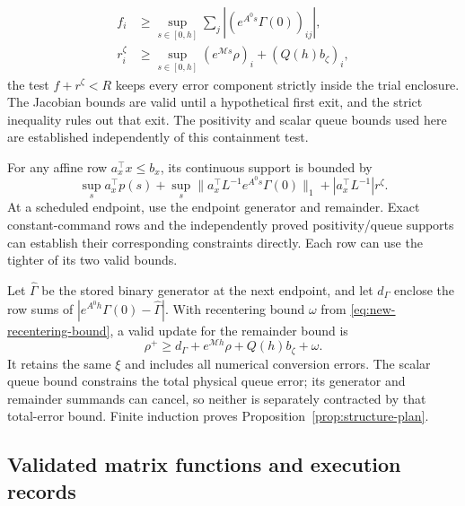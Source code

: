 \documentclass[journal,10pt]{IEEEtran}
\begin{document}
\begin{equation}
 \begin{aligned}
 f_i&\ge\sup_{s\in[0,h]}\sum_j|(e^{A^0s}\Gamma(0))_{ij}|,\\
 r_i^\zeta&\ge\sup_{s\in[0,h]}(e^{\mathcal Ms}\rho)_i
                            +(Q(h)b_\zeta)_i,
 \end{aligned}
 \label{eq:structure-continuous-radii}
\end{equation}
the test $f+r^\zeta<R$ keeps every error component strictly inside the
trial enclosure. The Jacobian bounds are valid until a hypothetical first
exit, and the strict inequality rules out that exit. The positivity and
scalar queue bounds used here are established independently of this
containment test.

For any affine row $a_x^\top x\le b_x$, its continuous support is bounded by
\begin{equation}
 \sup_s a_x^\top p(s)+
 \sup_s\|a_x^\top L^{-1}e^{A^0s}\Gamma(0)\|_1+
 |a_x^\top L^{-1}|r^\zeta.
 \label{eq:structure-signed-output}
\end{equation}
At a scheduled endpoint, use the endpoint generator and remainder.
Exact constant-command rows and the independently
proved positivity/queue supports can establish their corresponding constraints
directly. Each row can use the tighter of its two valid bounds.

Let $\widehat\Gamma$ be the stored binary generator at the next endpoint,
and let $d_\Gamma$ enclose the row sums of
$|e^{A^0h}\Gamma(0)-\widehat\Gamma|$. With recentering bound $\omega$ from
\eqref{eq:new-recentering-bound}, a valid update for the remainder bound is
\begin{equation}
 \rho^+\ge d_\Gamma+e^{\mathcal Mh}\rho+Q(h)b_\zeta+\omega.
 \label{eq:structure-endpoint-update}
\end{equation}
It retains the same $\xi$ and includes all numerical conversion errors.
The scalar queue bound constrains the total physical queue error; its
generator and remainder summands can cancel, so neither is separately
contracted by that total-error bound. Finite induction proves
Proposition~\ref{prop:structure-plan}.

\subsection{Validated matrix functions and execution records}
\end{document}
